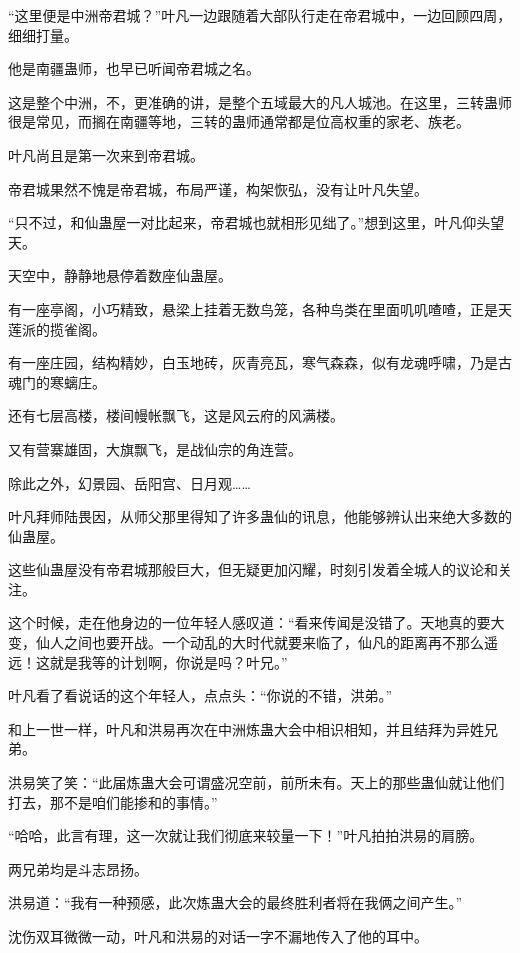 
\begin{this_body}

“这里便是中洲帝君城？”叶凡一边跟随着大部队行走在帝君城中，一边回顾四周，细细打量。

他是南疆蛊师，也早已听闻帝君城之名。

这是整个中洲，不，更准确的讲，是整个五域最大的凡人城池。在这里，三转蛊师很是常见，而搁在南疆等地，三转的蛊师通常都是位高权重的家老、族老。

叶凡尚且是第一次来到帝君城。

帝君城果然不愧是帝君城，布局严谨，构架恢弘，没有让叶凡失望。

“只不过，和仙蛊屋一对比起来，帝君城也就相形见绌了。”想到这里，叶凡仰头望天。

天空中，静静地悬停着数座仙蛊屋。

有一座亭阁，小巧精致，悬梁上挂着无数鸟笼，各种鸟类在里面叽叽喳喳，正是天莲派的揽雀阁。

有一座庄园，结构精妙，白玉地砖，灰青亮瓦，寒气森森，似有龙魂呼啸，乃是古魂门的寒螭庄。

还有七层高楼，楼间幔帐飘飞，这是风云府的风满楼。

又有营寨雄固，大旗飘飞，是战仙宗的角连营。

除此之外，幻景园、岳阳宫、日月观……

叶凡拜师陆畏因，从师父那里得知了许多蛊仙的讯息，他能够辨认出来绝大多数的仙蛊屋。

这些仙蛊屋没有帝君城那般巨大，但无疑更加闪耀，时刻引发着全城人的议论和关注。

这个时候，走在他身边的一位年轻人感叹道：“看来传闻是没错了。天地真的要大变，仙人之间也要开战。一个动乱的大时代就要来临了，仙凡的距离再不那么遥远！这就是我等的计划啊，你说是吗？叶兄。”

叶凡看了看说话的这个年轻人，点点头：“你说的不错，洪弟。”

和上一世一样，叶凡和洪易再次在中洲炼蛊大会中相识相知，并且结拜为异姓兄弟。

洪易笑了笑：“此届炼蛊大会可谓盛况空前，前所未有。天上的那些蛊仙就让他们打去，那不是咱们能掺和的事情。”

“哈哈，此言有理，这一次就让我们彻底来较量一下！”叶凡拍拍洪易的肩膀。

两兄弟均是斗志昂扬。

洪易道：“我有一种预感，此次炼蛊大会的最终胜利者将在我俩之间产生。”

沈伤双耳微微一动，叶凡和洪易的对话一字不漏地传入了他的耳中。


\end{this_body}
